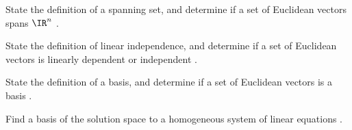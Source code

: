 \begin{readinessAssuranceOutcomes}
\item State the definition of a spanning set, and determine if a set of Euclidean vectors spans \(\IR^n\) .
\item State the definition of linear independence, and determine if a set of Euclidean vectors is linearly dependent or independent .
\item State the definition of a basis, and determine if a set of Euclidean vectors is a basis .
\item Find a basis of the solution space to a homogeneous system
of linear equations .
\end{readinessAssuranceOutcomes}
